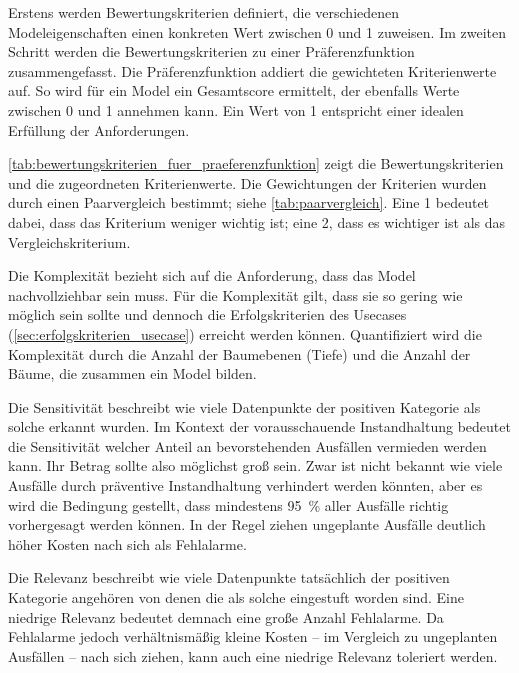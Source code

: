 Erstens werden Bewertungskriterien definiert, die verschiedenen Modeleigenschaften einen konkreten Wert zwischen \num{0} und \num{1} zuweisen. Im zweiten Schritt werden die Bewertungskriterien zu einer Präferenzfunktion zusammengefasst. Die Präferenzfunktion addiert die gewichteten Kriterienwerte auf. So wird für ein Model ein Gesamtscore ermittelt, der ebenfalls Werte zwischen \num{0} und \num{1} annehmen kann. Ein Wert von \num{1} entspricht einer idealen Erfüllung der Anforderungen.

\cref{tab:bewertungskriterien_fuer_praeferenzfunktion} zeigt die Bewertungskriterien und die zugeordneten Kriterienwerte. Die Gewichtungen der Kriterien wurden durch einen Paarvergleich bestimmt; siehe \cref{tab:paarvergleich}. Eine \num{1} bedeutet dabei, dass das Kriterium weniger wichtig ist; eine \num{2}, dass es wichtiger ist als das Vergleichskriterium.

Die Komplexität bezieht sich auf die Anforderung, dass das Model nachvollziehbar sein muss. Für die Komplexität gilt, dass sie so gering wie möglich sein sollte und dennoch die Erfolgskriterien des Usecases (\cref{sec:erfolgskriterien_usecase}) erreicht werden können. Quantifiziert wird die Komplexität durch die Anzahl der Baumebenen (Tiefe) und die Anzahl der Bäume, die zusammen ein Model bilden.

Die Sensitivität beschreibt wie viele Datenpunkte der positiven Kategorie als solche erkannt wurden. Im Kontext der vorausschauende Instandhaltung bedeutet die Sensitivität welcher Anteil an bevorstehenden Ausfällen vermieden werden kann. Ihr Betrag sollte also möglichst groß sein. Zwar ist nicht bekannt wie viele Ausfälle durch präventive Instandhaltung verhindert werden könnten, aber es wird die Bedingung gestellt, dass mindestens \SI{95}{\percent} aller Ausfälle richtig vorhergesagt werden können. In der Regel ziehen ungeplante Ausfälle deutlich höher Kosten nach sich als Fehlalarme.

Die Relevanz beschreibt wie viele Datenpunkte tatsächlich der positiven Kategorie angehören von denen die als solche eingestuft worden sind. Eine niedrige Relevanz bedeutet demnach eine große Anzahl Fehlalarme. Da Fehlalarme jedoch verhältnismäßig kleine Kosten -- im Vergleich zu ungeplanten Ausfällen -- nach sich ziehen, kann auch eine niedrige Relevanz toleriert werden.

